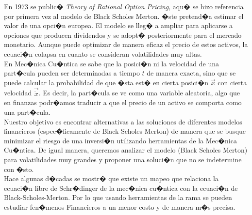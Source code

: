 \documentclass[portrait, a0b,final]{a0poster}%
\numberwithin{equation}{section}
\newenvironment{poster}{
  \begin{center}
  \begin{minipage}[c]{0.98\textwidth}
}{
  \end{minipage}
  \end{center}
}
\newenvironment{pcolumn}[1]{
  \begin{minipage}{#1\textwidth}
  \begin{center}
}{
  \end{center}
  \end{minipage}
}
\newcommand{\pbox}[4]{
\psshadowbox[#3]{
\begin{minipage}[t][#2][t]{#1}
#4
\end{minipage}
}}
\begin{document}
\begin{poster}
\begin{center}
\begin{pcolumn}{0.32}
{%
    \vspace{2cm}
    \begin{center}
        \pbox{0.8\textwidth}{}%
        {linewidth=2mm,framearc=0.1,linecolor=lightblue,fillstyle=gradient,gradangle=0,%
        gradbegin=white,gradend=whiteblue,gradmidpoint=1.0,framesep=1em}{%
        \begin{center}
            Introducci\'{o}n
        \end{center}}
    \end{center}
    \vspace{1.25cm}

    
     En 1973 se public� {\it Theory of Rational Option Pricing}, aqu� se 
     hizo referencia por primera vez al modelo de Black Scholes Merton. 
     �ste pretend�a estimar el valor de una opci�n europea. El modelo se 
     lleg� a ampliar para aplicarse a opciones que producen dividendos y 
     se adopt� posteriormente para el mercado monetario. Aunque puede  
     optimizar de manera eficaz el precio de estos activos, la ecuaci�n 
     colapsa en cuanto se consideran volatilidades muy altas.\\
     
     En Mec�nica Cu�ntica se sabe que la posici�n ni la velocidad de una 
     part�cula pueden ser determinadas a tiempo $t$ de manera exacta, sino 
     que se puede calcular la probabilidad de que �sta est� en cierta 
     posici�n $\vec{x}$ con cierta velocidad $\vec{\dot{x}}$. Es decir, la 
     part�cula se ve como una variable aleatoria, algo que en finanzas 
     podr�amos traducir a que el precio de un activo se comporta como una 
     part�cula.\\
     
     Nuestro objetivo es encontrar
     alternativas a las soluciones de diferentes modelos financieros 
     (espec�ficamente de Black Scholes Merton) de manera que se busque 
     minimizar el riesgo de una inversi�n utilizando herramientas de la 
     Mec�nica Cu�ntica. De igual manera, queremos analizar el modelo 
     (Black Scholes Merton) para volatilidades muy grandes y proponer una 
     soluci�n que no se indetermine con �sto.\\
     
     Hace algunas d�cadas se mostr� que existe un mapeo que relaciona la 
     ecuaci�n libre de Schr�dinger de la mec�nica cu�ntica con la ecuaci�n 
     de Black-Scholes-Merton. Por lo que usando herramientas de la rama se 
     pueden estudiar fen�menos Financieros a un menor costo y de manera m�s 
     precisa.\\
     
}
\end{pcolumn}
\end{center}
\end{poster}
\end{document}
